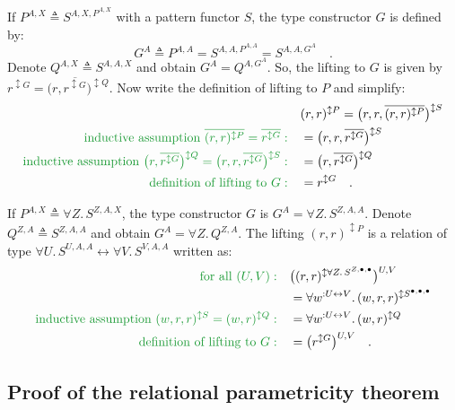 If $P^{A,X}\triangleq S^{A,X,P^{A,X}}$ with a pattern functor $S$,
the type constructor $G$ is defined by: 
\[
G^{A}\triangleq P^{A,A}=S^{A,A,P^{A,A}}=S^{A,A,G^{A}}\quad.
\]
Denote $Q^{A,X}\triangleq S^{A,A,X}$ and obtain $G^{A}=Q^{A,G^{A}}$.
So, the lifting to $G$ is given by $r^{\updownarrow G}=\big(r,\overline{r^{\updownarrow G}}\big)^{\updownarrow Q}$.
Now write the definition of lifting to $P$ and simplify:
\begin{align*}
 & (r,r)^{\updownarrow P}=\big(r,r,\overline{(r,r)^{\updownarrow P}}\big)^{\updownarrow S}\\
{\color{greenunder}\text{inductive assumption }\overline{(r,r)^{\updownarrow P}}=\overline{r^{\updownarrow G}}:}\quad & =\big(r,r,\overline{r^{\updownarrow G}}\big)^{\updownarrow S}\\
{\color{greenunder}\text{inductive assumption }\big(r,\overline{r^{\updownarrow G}}\big)^{\updownarrow Q}=\big(r,r,\overline{r^{\updownarrow G}}\big)^{\updownarrow S}:}\quad & =\big(r,\overline{r^{\updownarrow G}}\big)^{\updownarrow Q}\\
{\color{greenunder}\text{definition of lifting to }G:}\quad & =r^{\updownarrow G}\quad.
\end{align*}

If $P^{A,X}\triangleq\forall Z.\,S^{Z,A,X}$, the type constructor
$G$ is $G^{A}=\forall Z.\,S^{Z,A,A}$. Denote $Q^{Z,A}\triangleq S^{Z,A,A}$
and obtain $G^{A}=\forall Z.\,Q^{Z,A}$. The lifting $(r,r)^{\updownarrow P}$
is a relation of type $\forall U.\,S^{U,A,A}\leftrightarrow\forall V.\,S^{V,A,A}$
written as:
\begin{align*}
{\color{greenunder}\text{for all }(U,V):}\quad & \big((r,r)^{\updownarrow\forall Z.\,S^{Z,\bullet,\bullet}}\big)^{U,V}\\
 & =\forall w^{:U\leftrightarrow V}.\,(w,r,r)^{\updownarrow S^{\bullet,\bullet,\bullet}}\\
{\color{greenunder}\text{inductive assumption }(w,r,r)^{\updownarrow S}=(w,r)^{\updownarrow Q}:}\quad & =\forall w^{:U\leftrightarrow V}.\,(w,r)^{\updownarrow Q}\\
{\color{greenunder}\text{definition of lifting to }G:}\quad & =\big(r^{\updownarrow G}\big)^{U,V}\quad.
\end{align*}


\subsection{Proof of the relational parametricity theorem\label{subsec:Relational-parametricity-theorem}}

